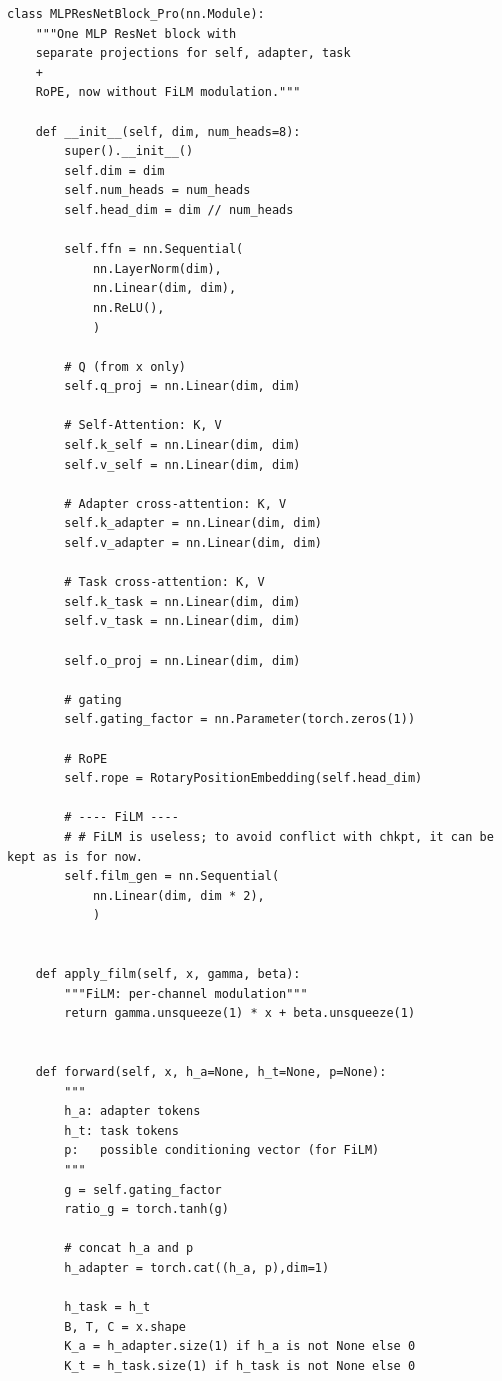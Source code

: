 {\small
\begin{verbatim}
class MLPResNetBlock_Pro(nn.Module):
    """One MLP ResNet block with 
    separate projections for self, adapter, task 
    + 
    RoPE, now without FiLM modulation."""

    def __init__(self, dim, num_heads=8):
        super().__init__()
        self.dim = dim
        self.num_heads = num_heads
        self.head_dim = dim // num_heads

        self.ffn = nn.Sequential(
            nn.LayerNorm(dim),
            nn.Linear(dim, dim),
            nn.ReLU(),
            )

        # Q (from x only)
        self.q_proj = nn.Linear(dim, dim)

        # Self-Attention: K, V
        self.k_self = nn.Linear(dim, dim)
        self.v_self = nn.Linear(dim, dim)

        # Adapter cross-attention: K, V
        self.k_adapter = nn.Linear(dim, dim)
        self.v_adapter = nn.Linear(dim, dim)

        # Task cross-attention: K, V
        self.k_task = nn.Linear(dim, dim)
        self.v_task = nn.Linear(dim, dim)

        self.o_proj = nn.Linear(dim, dim)

        # gating
        self.gating_factor = nn.Parameter(torch.zeros(1))

        # RoPE
        self.rope = RotaryPositionEmbedding(self.head_dim)

        # ---- FiLM ----
        # # FiLM is useless; to avoid conflict with chkpt, it can be kept as is for now.
        self.film_gen = nn.Sequential(
            nn.Linear(dim, dim * 2), 
            )


    def apply_film(self, x, gamma, beta):
        """FiLM: per-channel modulation"""
        return gamma.unsqueeze(1) * x + beta.unsqueeze(1)


    def forward(self, x, h_a=None, h_t=None, p=None):
        """
        h_a: adapter tokens
        h_t: task tokens
        p:   possible conditioning vector (for FiLM)
        """
        g = self.gating_factor
        ratio_g = torch.tanh(g)

        # concat h_a and p
        h_adapter = torch.cat((h_a, p),dim=1)

        h_task = h_t
        B, T, C = x.shape
        K_a = h_adapter.size(1) if h_a is not None else 0
        K_t = h_task.size(1) if h_task is not None else 0


\end{verbatim}}
